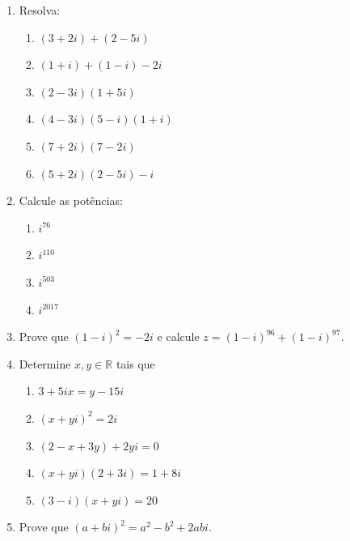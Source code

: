 \documentclass[a4paper,5pt]{amsbook}
\begin{document}
\vspace{1cm}
\begin{enumerate}
	\vspace{0.5cm}
	\item Resolva:

		\begin{enumerate}
			\item $(3+2i)+(2-5i)$
			\item $(1+i)+(1-i)-2i$
			\item $(2-3i)(1+5i)$
			\item $(4-3i)(5-i)(1+i)$
			\item $(7+2i)(7-2i)$
			\item $(5+2i)(2-5i)-i$
		\end{enumerate}

	\vspace{0.5cm}
	\item Calcule as pot\^{e}ncias:
		
		\begin{enumerate}
			\item $i^{76}$
			\item $i^{110}$
			\item $i^{503}$
			\item $i^{2017}$
		\end{enumerate}

	\vspace{0.5cm}
	\item Prove que $(1-i)^2=-2i$ e calcule $z = (1-i)^{96}+(1-i)^{97}$.

	\vspace{0.5cm}
	\item Determine $x, y\in \mathbb{R}$ tais que 

		\begin{enumerate}
			\item $3+5ix = y-15i$
			\item $(x+yi)^2=2i$
			\item $(2-x+3y)+2yi=0$
			\item $(x+yi)(2+3i)=1+8i$
			\item $(3-i)(x+yi)=20$
		\end{enumerate}

	\vspace{0.5cm}
	\item Prove que $(a+bi)^2 = a^2 - b^2 + 2abi$.
\end{enumerate}
\end{document}
